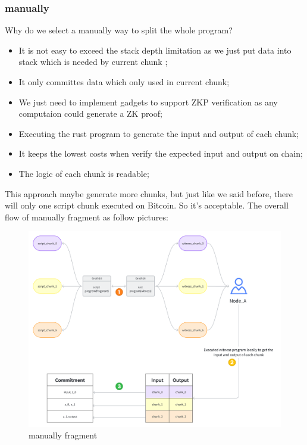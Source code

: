 \subsubsection{manually}

Why do we select a manually way to split the whole program?

\begin{itemize}
    \item It is not easy to exceed the stack depth limitation as we just put data into stack which is needed by current chunk ;
    \item It only committes data which only used in current chunk;
    \item We just need to implement gadgets to support ZKP verification as any computaion could generate a ZK proof;
    \item Executing the rust program to generate the input and output of each chunk;
    \item It keeps the lowest costs when verify the expected input and output on chain;
    \item The logic of each chunk is readable;
\end{itemize}

This approach maybe generate more chunks, but just like we said before, there will only one script chunk executed on Bitcoin. So it's acceptable.
The overall flow of manually fragment as follow pictures:
\begin{figure}[ht] 
    \centering  
    \includegraphics[width=0.85\columnwidth]{images/manually-fragment.png} 
    \caption{manually fragment}
    \label{fig:manually-fragment}
\end{figure}

